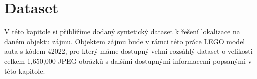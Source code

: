 \chapter{Dataset}
\label{sec:Chapter3}
V této kapitole si přiblížíme dodaný syntetický dataset k řešení lokalizace na daném objektu zájmu. Objektem zájmu bude v rámci této práce LEGO model auta s kódem 42022, pro který máme dostupný velmi rozsáhlý dataset o velikosti celkem 1,650,000 JPEG obrázků s dalšími dostupnými informacemi popsanými v této kapitole.
\endinput